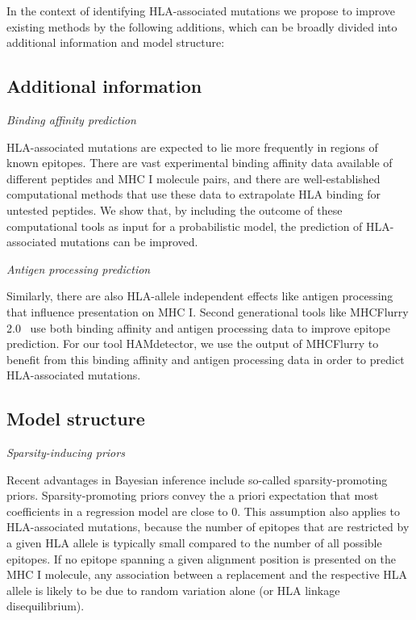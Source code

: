 \documentclass[fleqn,11pt]{SelfArx} %
\begin{document}
In the context of identifying HLA-associated mutations we propose to improve existing methods by the following additions, which can be broadly divided into  additional information and model structure:
\subsection*{Additional information}

  \textit{Binding affinity prediction}

    HLA-associated mutations are expected to lie more frequently in regions of known epitopes. There are vast experimental binding affinity data available of different peptides and MHC I molecule pairs, and there are well-established computational methods that use these data to extrapolate HLA binding for untested peptides. We show that, by including the outcome of these computational tools as input for a probabilistic model, the prediction of HLA-associated mutations can be improved.

  \textit{Antigen processing prediction}
  
    Similarly, there are also HLA-allele independent effects like antigen processing that influence presentation on MHC I. Second generational tools like MHCFlurry 2.0~\cite{ODonnell2020} use both binding affinity and antigen processing data to improve epitope prediction. For our tool HAMdetector, we use the output of MHCFlurry to benefit from this binding affinity and antigen processing data in order to predict HLA-associated mutations.

\subsection*{Model structure}

  \textit{Sparsity-inducing priors}
  
  Recent advantages in Bayesian inference include so-called sparsity-promoting priors. Sparsity-promoting priors convey the a priori expectation that most coefficients in a regression model are close to 0. This assumption also applies to HLA-associated mutations, because the number of epitopes that are restricted by a given HLA allele is typically small compared to the number of all possible epitopes. If no epitope spanning a given alignment position is presented on the MHC I molecule, any association between a replacement and the respective HLA allele  is likely to be due to random variation alone (or HLA linkage disequilibrium).
  
\end{document}
